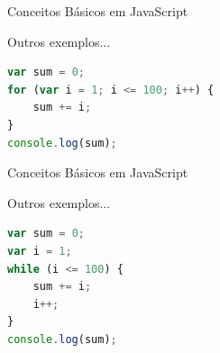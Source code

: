 \documentclass[xcolor=dvipsnames,table]{beamer}
\begin{document}
\begin{frame}[fragile]{Conceitos Básicos em JavaScript}
\begin{block}{Outros exemplos...}
\begin{lstlisting}[language=JavaScript]
var sum = 0;
for (var i = 1; i <= 100; i++) {
	sum += i;
}
console.log(sum);
\end{lstlisting}	
\end{block}
\end{frame}

\begin{frame}[fragile]{Conceitos Básicos em JavaScript}
\begin{block}{Outros exemplos...}
\begin{lstlisting}[language=JavaScript]
var sum = 0;
var i = 1;
while (i <= 100) {
	sum += i;
	i++;
}
console.log(sum);
\end{lstlisting}	
\end{block}
\end{frame}
	
	\begin{frame}
		\titlepage
	\end{frame}
	
\end{document}

